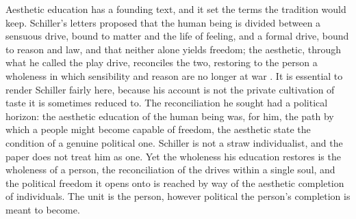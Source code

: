 Aesthetic education has a founding text, and it set the terms the tradition would keep. Schiller's letters proposed that the human being is divided between a sensuous drive, bound to matter and the life of feeling, and a formal drive, bound to reason and law, and that neither alone yields freedom; the aesthetic, through what he called the play drive, reconciles the two, restoring to the person a wholeness in which sensibility and reason are no longer at war \parencite{schiller1967}. It is essential to render Schiller fairly here, because his account is not the private cultivation of taste it is sometimes reduced to. The reconciliation he sought had a political horizon: the aesthetic education of the human being was, for him, the path by which a people might become capable of freedom, the aesthetic state the condition of a genuine political one. Schiller is not a straw individualist, and the paper does not treat him as one. Yet the wholeness his education restores is the wholeness of a person, the reconciliation of the drives within a single soul, and the political freedom it opens onto is reached by way of the aesthetic completion of individuals. The unit is the person, however political the person's completion is meant to become.

